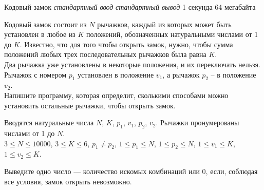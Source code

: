 \begin{problem}%
{Кодовый замок}%
{\textsl{стандартный ввод}}%
{\textsl{стандартный вывод}}%
{1 секунда}%
{64 мегабайта}{}

Кодовый замок состоит из $N$ рычажков, каждый из которых может быть установлен в любое из $K$ положений, обозначенных натуральными числами от 1 до $K$. Известно, что для того чтобы открыть замок, нужно, чтобы сумма положений любых трех последовательных рычажков была равна $K$.\\

Два рычажка уже установлены в некоторые положения, и их переключать нельзя. Рычажок с номером $p_1$ установлен в положение $v_1$, а рычажок $p_2$ – в положение $v_2$.\\

Напишите программу, которая определит, сколькими способами можно установить остальные рычажки, чтобы открыть замок.

\InputFile

Вводятся натуральные числа $N$, $K$, $p_1$, $v_1$, $p_2$, $v_2$. Рычажки пронумерованы числами от 1 до $N$.\\

$3 \le N \le 10000$, $3 \le K \le 6$, $p_1 \ne p_2$, $1 \le p_1 \le N$, $1 \le p_2 \le N$, $1 \le v_1 \le K$, $1 \le v_2 \le K$.

\OutputFile

Выведите одно число — количество искомых комбинаций или 0, если, соблюдая все условия, замок открыть невозможно.

\Examples

\begin{example}
%
%
%
%
\end{example}
\end{problem}